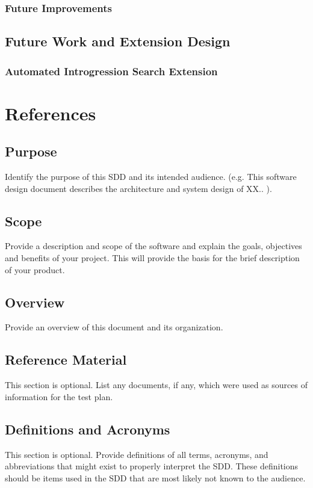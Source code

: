\documentclass[12pt]{article}
\begin{document}
\subsubsection{Future Improvements}
\subsection{Future Work and Extension Design}
\subsubsection{Automated Introgression Search Extension}
\section{References}

\subsection{Purpose}
Identify the purpose of this SDD and its intended audience. (e.g. This software design
document describes the architecture and system design of XX.. ).


\subsection{Scope}
Provide a description and scope of the software and explain the goals, objectives and benefits
of your project. This will provide the basis for the brief description of your product.


\subsection{Overview}
Provide an overview of this document and its organization.



\subsection{Reference Material}
This section is optional.
List any documents, if any, which were used as sources of information for the test plan. 


\subsection{Definitions and Acronyms}
This section is optional.
Provide  definitions of all terms, acronyms, and  abbreviations that might exist to  properly 
interpret the SDD. These definitions should be items used in the SDD that are most likely not 
known to the audience.
\end{document}
